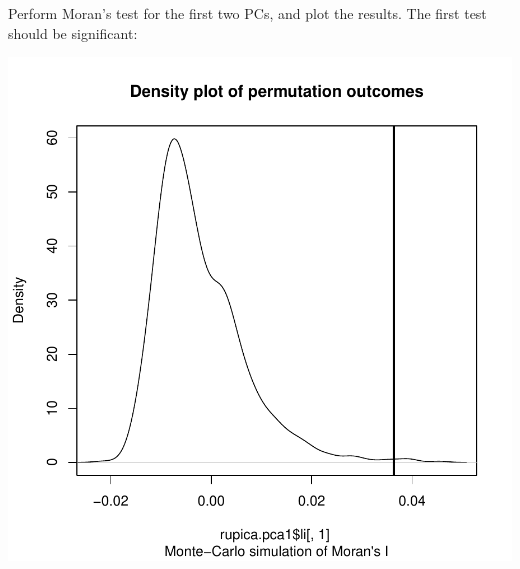 \documentclass{article}
\begin{document}
Perform Moran's test for the first two PCs, and plot the results.
The first test should be significant:
\begin{Schunk}
\end{Schunk}
\includegraphics{figs/spca-038}
\end{document}
